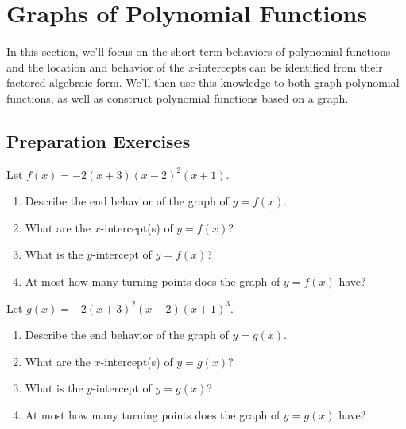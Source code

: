 \section{Graphs of Polynomial Functions} \label{functions-polynomial-graphs}

In this section, we'll focus on the short-term behaviors of polynomial functions and the location and behavior of the $x$-intercepts can be identified from their factored algebraic form.  We'll then use this knowledge to both graph polynomial functions, as well as construct polynomial functions based on a graph. \\[0.5em]




\subsection*{Preparation Exercises} \label{prep-functions-polynomial-graphs}


\begin{myPrep}
Let $f(x) =-2(x+3)(x-2)^2(x+1)$.
	\begin{enumerate}
		\item Describe the end behavior of the graph of $y=f(x)$.
		\vfill

		\item What are the $x$-intercept(s) of $y=f(x)$?
		\vfill

		\item What is the $y$-intercept of $y=f(x)$?
		\vfill
	
		\item At most how many turning points does the graph of $y=f(x)$ have?
		\vfill

	\end{enumerate}
\end{myPrep}

\begin{myPrep}

Let $g(x) =-2(x+3)^2(x-2)(x+1)^3$.
	\begin{enumerate}
		\item Describe the end behavior of the graph of $y=g(x)$.
		\vfill

		\item What are the $x$-intercept(s) of $y=g(x)$?
		\vfill

		\item What is the $y$-intercept of $y=g(x)$?
		\vfill
	
		\item At most how many turning points does the graph of $y=g(x)$ have?
		\vfill

	\end{enumerate}
\end{myPrep}

